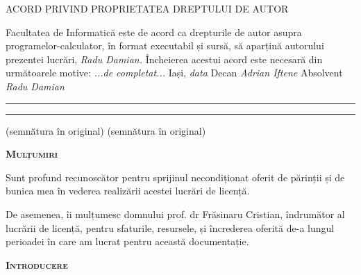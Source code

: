 \documentclass[12pt,a4paper]{report}
\begin{document}
\begin{titlepage}

	\hfill \break
	\begin{center}
	ACORD PRIVIND PROPRIETATEA DREPTULUI DE AUTOR
	\end{center}
	
	\hfill \break
	\hfill \break
	\justifying
	Facultatea de Informatică este de acord ca drepturile
	de autor asupra programelor-calculator, în format
	executabil și sursă, să aparțină autorului prezentei
	lucrări, \emph{Radu Damian.}
	\hfill \break
	\hfill \break
	Încheierea acestui acord este necesară din următoarele
	motive:
	\hfill \break
	\hfill \break
	\hfill \break
	\emph{...de completat...}
	\hfill \break
	\hfill \break
	\hfill \break
	\hfill \break
	\hfill \break
	\hfill \break
	Iași, \emph{data}
	\hfill \break
	\hfill \break
	\hfill \break
	Decan \emph{Adrian Iftene} \hspace{18em} Absolvent \emph{Radu Damian}  
	\hfill \break
	\hfill \break
	\rule{4.5cm}{0.15mm} \hspace{16em} \rule{4.5cm}{0.15mm}
	(semnătura în original) \hspace{17em} (semnătura în original)
	
	
	

\end{titlepage}
\hfill \break
	\begin{center}
	{\scshape\large \textbf{Mulțumiri} \par}
	\end{center}
	
\begin{flushright}
\hfill \break
\hfill \break
Sunt profund recunoscător pentru sprijinul necondiționat oferit de părinții și de bunica mea în vederea realizării acestei lucrări de licență.
\end{flushright}
\hfill \break
\hfill \break
\hfill \break
\begin{flushright}
De asemenea, îi mulțumesc domnului prof. dr Frăsinaru Cristian, îndrumător al lucrării de licență, pentru sfaturile, resursele, și încrederea oferită de-a lungul perioadei în care am lucrat pentru această documentație.
\end{flushright}

\newpage
   
\renewcommand*{\contentsname}{Cuprins}
\tableofcontents
\newpage

\hfill \break

	\hfill \break
	\begin{center}
	{\scshape\large \textbf{Introducere} \par}
	\end{center}
	
\end{document}
